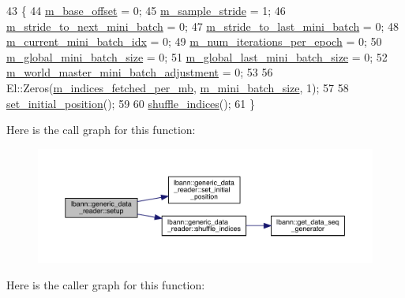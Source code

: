 \begin{DoxyCode}
43                                 \{
44   \hyperlink{classlbann_1_1generic__data__reader_a77946c4dca753c23f39e9a490eba1229}{m\_base\_offset} = 0;
45   \hyperlink{classlbann_1_1generic__data__reader_a58461c39de7e17eafc5b98aec99cbb9b}{m\_sample\_stride} = 1;
46   \hyperlink{classlbann_1_1generic__data__reader_a02c4632cc7cad5c3e4062934c41717a0}{m\_stride\_to\_next\_mini\_batch} = 0;
47   \hyperlink{classlbann_1_1generic__data__reader_ac46922f2ef4f392bcc7c59c21685a3ff}{m\_stride\_to\_last\_mini\_batch} = 0;
48   \hyperlink{classlbann_1_1generic__data__reader_aefd4bc0bf95de1e2500827581acf3536}{m\_current\_mini\_batch\_idx} = 0;
49   \hyperlink{classlbann_1_1generic__data__reader_ab570063483a1f604ca2fc536c3d83de7}{m\_num\_iterations\_per\_epoch} = 0;
50   \hyperlink{classlbann_1_1generic__data__reader_a7cd8fa7b1db9ea3d154a411f36992476}{m\_global\_mini\_batch\_size} = 0;
51   \hyperlink{classlbann_1_1generic__data__reader_a1d6f2d378a3f152e20b3def16f52c003}{m\_global\_last\_mini\_batch\_size} = 0;
52   \hyperlink{classlbann_1_1generic__data__reader_acd33b2dbdfd4043ecc62cc13789532a2}{m\_world\_master\_mini\_batch\_adjustment} = 0;
53 
56   El::Zeros(\hyperlink{classlbann_1_1generic__data__reader_a4ee1a159c74561c15a5e0c267ad3cc6a}{m\_indices\_fetched\_per\_mb}, \hyperlink{classlbann_1_1generic__data__reader_a96f87a7d09711ab3eee3940ff2aa36ec}{m\_mini\_batch\_size}, 1);
57 
58   \hyperlink{classlbann_1_1generic__data__reader_ac6d4a5ba1d4e1134620cddcac343bf59}{set\_initial\_position}();
59 
60   \hyperlink{classlbann_1_1generic__data__reader_af1aaa4d1a693974c1b1f1318b6ed60b8}{shuffle\_indices}();
61 \}
\end{DoxyCode}
Here is the call graph for this function\+:\nopagebreak
\begin{figure}[H]
\begin{center}
\leavevmode
\includegraphics[width=350pt]{classlbann_1_1generic__data__reader_a879bb7dcb57a0aa1ef9c5039f5b0efda_cgraph}
\end{center}
\end{figure}
Here is the caller graph for this function\+:\nopagebreak
